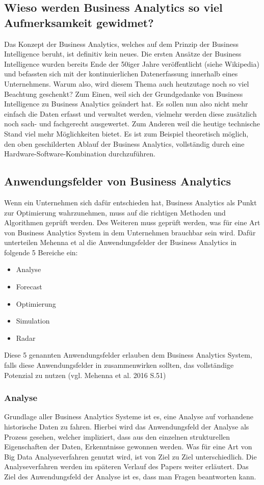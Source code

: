 \documentclass[12pt,twocolumn,twoside]{conference}   %
\begin{document}
\subsection{Wieso werden Business Analytics so viel Aufmerksamkeit gewidmet?}
Das Konzept der Business Analytics, welches auf dem Prinzip der Business Intelligence beruht, ist definitiv kein neues. Die ersten Ansätze der Business Intelligence wurden bereits Ende der 50iger Jahre veröffentlicht (siehe Wikipedia) und befassten sich mit der kontinuierlichen Datenerfassung innerhalb eines Unternehmens. Warum also, wird diesem Thema auch heutzutage noch so viel Beachtung geschenkt? Zum Einen, weil sich der Grundgedanke von Business Intelligence zu Business Analytics geändert hat. Es sollen nun also nicht mehr einfach die Daten erfasst und verwaltet werden, vielmehr werden diese zusätzlich noch sach- und fachgerecht ausgewertet. Zum Anderen weil die heutige technische Stand viel mehr Möglichkeiten bietet. Es ist zum Beispiel theoretisch möglich, den oben geschilderten Ablauf der Business Analytics, vollständig durch eine Hardware-Software-Kombination durchzuführen. 

\subsection{Anwendungsfelder von Business Analytics}
Wenn ein Unternehmen sich dafür entschieden hat, Business Analytics als Punkt zur Optimierung wahrzunehmen, muss auf  die richtigen Methoden und Algorithmen geprüft werden. Des Weiteren muss geprüft werden, was für eine Art von Business Analytics System in dem Unternehmen brauchbar sein wird. Dafür unterteilen  Mehenna et al die Anwendungsfelder der Business Analytics in folgende 5 Bereiche ein:

\begin{itemize}
\item Analyse
\item Forecast
\item Optimierung
\item Simulation
\item Radar
\end{itemize}

Diese 5 genannten Anwendungsfelder erlauben dem Business Analytics System, falls diese Anwendungsfelder in zusammenwirken sollten, das vollständige Potenzial zu nutzen (vgl. Mehenna et al. 2016 S.51) 

\subsubsection{Analyse}
Grundlage aller Business Analytics Systeme ist es, eine Analyse auf vorhandene historische Daten zu fahren. Hierbei wird das Anwendungsfeld der Analyse als Prozess gesehen, welcher impliziert, dass aus den einzelnen strukturellen Eigenschaften der Daten, Erkenntnisse gewonnen werden. Was für eine Art von Big Data Analyseverfahren genutzt wird, ist von Ziel zu Ziel unterschiedlich. Die Analyseverfahren werden im späteren Verlauf des Papers weiter erläutert. Das Ziel des Anwendungsfeld der Analyse ist es, dass man Fragen beantworten kann. 
\end{document}
